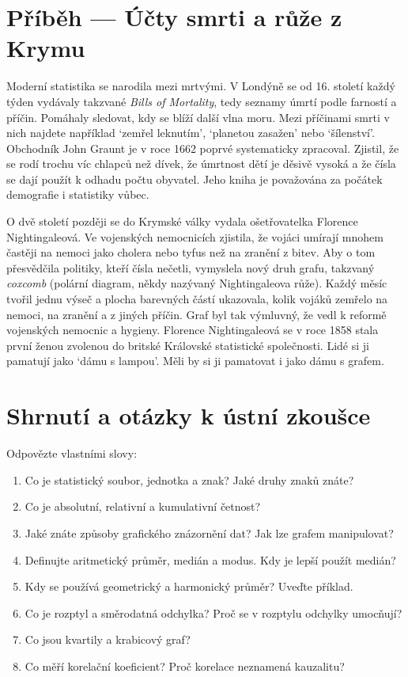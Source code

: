 \section{Příběh --- Účty smrti a růže z Krymu}

Moderní statistika se narodila mezi mrtvými. V Londýně se od 16. století každý týden vydávaly takzvané \textit{Bills of Mortality}, tedy seznamy úmrtí podle farností a příčin. Pomáhaly sledovat, kdy se blíží další vlna moru. Mezi příčinami smrti v nich najdete například `zemřel leknutím', `planetou zasažen' nebo `šílenství'. Obchodník John Graunt je v roce 1662 poprvé systematicky zpracoval. Zjistil, že se rodí trochu víc chlapců než dívek, že úmrtnost dětí je děsivě vysoká a že čísla se dají použít k odhadu počtu obyvatel. Jeho kniha je považována za počátek demografie i statistiky vůbec.

O dvě století později se do Krymské války vydala ošetřovatelka Florence Nightingaleová. Ve vojenských nemocnicích zjistila, že vojáci umírají mnohem častěji na nemoci jako cholera nebo tyfus než na zranění z bitev. Aby o tom přesvědčila politiky, kteří čísla nečetli, vymyslela nový druh grafu, takzvaný \textit{coxcomb} (polární diagram, někdy nazývaný Nightingaleova růže). Každý měsíc tvořil jednu výseč a plocha barevných částí ukazovala, kolik vojáků zemřelo na nemoci, na zranění a z jiných příčin. Graf byl tak výmluvný, že vedl k reformě vojenských nemocnic a hygieny. Florence Nightingaleová se v roce 1858 stala první ženou zvolenou do britské Královské statistické společnosti. Lidé si ji pamatují jako `dámu s lampou'. Měli by si ji pamatovat i jako dámu s grafem.

\section{Shrnutí a otázky k ústní zkoušce}

\begin{problem}
  Odpovězte vlastními slovy:
  \begin{enumerate}
    \item Co je statistický soubor, jednotka a znak? Jaké druhy znaků znáte?
    \item Co je absolutní, relativní a kumulativní četnost?
    \item Jaké znáte způsoby grafického znázornění dat? Jak lze grafem manipulovat?
    \item Definujte aritmetický průměr, medián a modus. Kdy je lepší použít medián?
    \item Kdy se používá geometrický a harmonický průměr? Uveďte příklad.
    \item Co je rozptyl a směrodatná odchylka? Proč se v rozptylu odchylky umocňují?
    \item Co jsou kvartily a krabicový graf?
    \item Co měří korelační koeficient? Proč korelace neznamená kauzalitu?
  \end{enumerate}
\end{problem}
